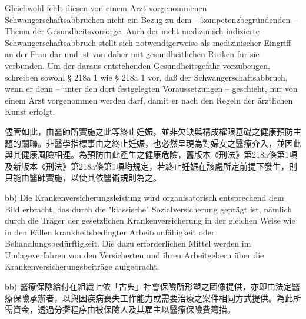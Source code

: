 \documentclass[12pt]{article}
\begin{document}
\begin{sourcepara}[title={原文E.200}]
Gleichwohl fehlt diesen von einem Arzt vorgenommenen Schwangerschaftsabbrüchen nicht ein Bezug zu dem -- kompetenzbegründenden -- Thema der Gesundheitsvorsorge. Auch der nicht medizinisch indizierte Schwangerschaftsabbruch stellt sich notwendigerweise als medizinischer Eingriff an der Frau dar und ist von daher mit gesundheitlichen Risiken für sie verbunden. Um der daraus entstehenden Gesundheitsgefahr vorzubeugen, schreiben sowohl § 218a \abbrAbs{} 1 \abbrStGB{} \abbrAF{} wie § 218a \abbrAbs{} 1 \abbrStGB{} \abbrNF{} vor, daß der Schwangerschaftsabbruch, wenn er denn -- unter den dort festgelegten Voraussetzungen -- geschieht, nur von einem Arzt vorgenommen werden darf, damit er nach den Regeln der ärztlichen Kunst erfolgt.
\end{sourcepara}
\begin{transpara}
儘管如此，由醫師所實施之此等終止妊娠，並非欠缺與構成權限基礎之健康預防主題的關聯。非醫學指標事由之終止妊娠，也必然呈現為對婦女之醫療介入，並因此與其健康風險相連。為預防由此產生之健康危險，舊版本《刑法》第218a條第1項及新版本《刑法》第218a條第1項均規定，若終止妊娠在該處所定前提下發生，則只能由醫師實施，以使其依醫術規則為之。
\end{transpara}

\begin{sourcepara}[title={原文E.201}]
bb) Die Krankenversicherungsleistung wird organisatorisch entsprechend dem Bild erbracht, das durch die "klassische" Sozialversicherung geprägt ist, nämlich durch die Träger der gesetzlichen Krankenversicherung in der gleichen Weise wie in den Fällen krankheitsbedingter Arbeitsunfähigkeit oder Behandlungsbedürftigkeit. Die dazu erforderlichen Mittel werden im Umlageverfahren von den Versicherten und ihren Arbeitgebern über die Krankenversicherungsbeiträge aufgebracht.
\end{sourcepara}
\begin{transpara}
bb) 醫療保險給付在組織上依「古典」社會保險所形塑之圖像提供，亦即由法定醫療保險承辦者，以與因疾病喪失工作能力或需要治療之案件相同方式提供。為此所需資金，透過分攤程序由被保險人及其雇主以醫療保險費籌措。
\end{transpara}
\end{document}
